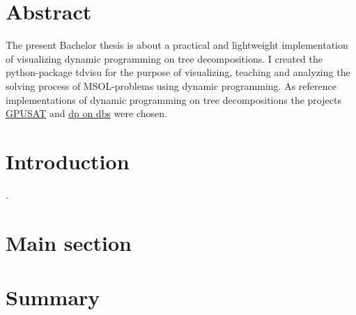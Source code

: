 \documentclass[a4paper, 12pt]{scrartcl}
\begin{document}
\begin{titlepage}
	\begin{center}
		
	\end{center}
\end{titlepage}

\tableofcontents

\newpage

\section{Abstract}
\vspace{4ex}
The present Bachelor thesis is about a practical and lightweight implementation of visualizing dynamic programming on tree decompositions.
I created the python-package tdvisu for the purpose of visualizing, teaching and analyzing the solving process of MSOL-problems using dynamic programming.
As reference implementations of dynamic programming on tree decompositions the projects \href{https://github.com/daajoe/GPUSAT}{GPUSAT} and \href{https://github.com/hmarkus/dp_on_dbs}{dp on dbs} were chosen.

\newpage


\section{Introduction}

\newpage.
\section{Main section}


\section{Summary}

{}

\end{document}
